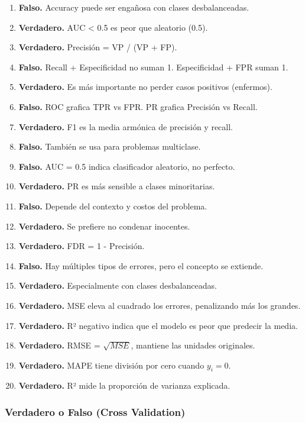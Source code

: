 \documentclass[12pt]{article}
\begin{document}
\begin{enumerate}
    \item \textbf{Falso.} Accuracy puede ser engañosa con clases desbalanceadas.
    \item \textbf{Verdadero.} AUC < 0.5 es peor que aleatorio (0.5).
    \item \textbf{Verdadero.} Precisión = VP / (VP + FP).
    \item \textbf{Falso.} Recall + Especificidad no suman 1. Especificidad + FPR suman 1.
    \item \textbf{Verdadero.} Es más importante no perder casos positivos (enfermos).
    \item \textbf{Falso.} ROC grafica TPR vs FPR. PR grafica Precisión vs Recall.
    \item \textbf{Verdadero.} F1 es la media armónica de precisión y recall.
    \item \textbf{Falso.} También se usa para problemas multiclase.
    \item \textbf{Falso.} AUC = 0.5 indica clasificador aleatorio, no perfecto.
    \item \textbf{Verdadero.} PR es más sensible a clases minoritarias.
    \item \textbf{Falso.} Depende del contexto y costos del problema.
    \item \textbf{Verdadero.} Se prefiere no condenar inocentes.
    \item \textbf{Verdadero.} FDR = 1 - Precisión.
    \item \textbf{Falso.} Hay múltiples tipos de errores, pero el concepto se extiende.
    \item \textbf{Verdadero.} Especialmente con clases desbalanceadas.
    \item \textbf{Verdadero.} MSE eleva al cuadrado los errores, penalizando más los grandes.
    \item \textbf{Verdadero.} R² negativo indica que el modelo es peor que predecir la media.
    \item \textbf{Verdadero.} RMSE = $\sqrt{MSE}$, mantiene las unidades originales.
    \item \textbf{Verdadero.} MAPE tiene división por cero cuando $y_i = 0$.
    \item \textbf{Verdadero.} R² mide la proporción de varianza explicada.
\end{enumerate}

\subsubsection{Verdadero o Falso (Cross Validation)}
\end{document}
